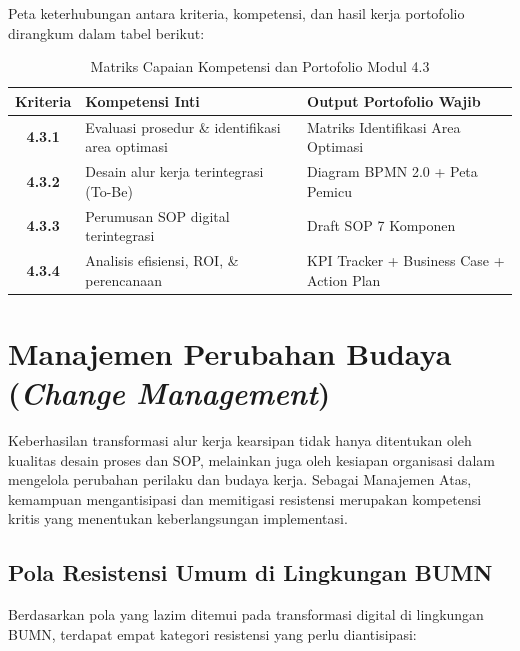 \documentclass[12pt,a4paper]{report}
\begin{document}
\vspace{0.3cm}
\noindent
Peta keterhubungan antara kriteria, kompetensi, dan hasil kerja portofolio dirangkum dalam tabel berikut:

\begin{table}[htbp]
\centering
\small
\caption{Matriks Capaian Kompetensi dan Portofolio Modul 4.3}
\begin{tabularx}{\textwidth}{@{} c >{\raggedright\arraybackslash}X >{\raggedright\arraybackslash}X @{}}
\toprule
\textbf{Kriteria} & \textbf{Kompetensi Inti} & \textbf{Output Portofolio Wajib} \\
\midrule
\textbf{4.3.1} & Evaluasi prosedur \& identifikasi area optimasi & Matriks Identifikasi Area Optimasi \\
\textbf{4.3.2} & Desain alur kerja terintegrasi (To-Be) & Diagram BPMN 2.0 + Peta Pemicu \\
\textbf{4.3.3} & Perumusan SOP digital terintegrasi & Draft SOP 7 Komponen \\
\textbf{4.3.4} & Analisis efisiensi, ROI, \& perencanaan & KPI Tracker + Business Case + Action Plan \\
\bottomrule
\end{tabularx}
\end{table}

\section{Manajemen Perubahan Budaya (\textit{Change Management})}
Keberhasilan transformasi alur kerja kearsipan tidak hanya ditentukan oleh kualitas desain proses dan SOP, melainkan juga oleh kesiapan organisasi dalam mengelola perubahan perilaku dan budaya kerja. Sebagai Manajemen Atas, kemampuan mengantisipasi dan memitigasi resistensi merupakan kompetensi kritis yang menentukan keberlangsungan implementasi.

\subsection{Pola Resistensi Umum di Lingkungan BUMN}
Berdasarkan pola yang lazim ditemui pada transformasi digital di lingkungan BUMN, terdapat empat kategori resistensi yang perlu diantisipasi:
\end{document}
